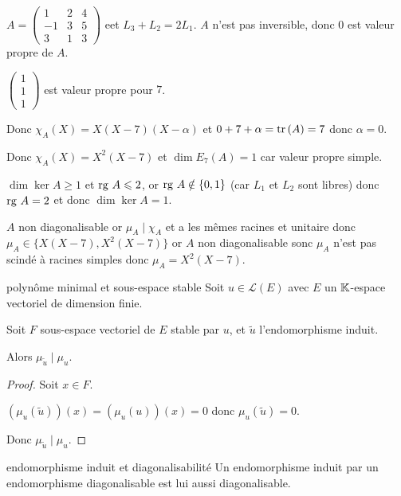 \begin{exemple}
    $A = \begin{pmatrix}
        1 & 2 & 4 \\
        -1 & 3 & 5 \\
        3 & 1 & 3 
    \end{pmatrix}$ eet $L_3 + L_2 = 2L_1$. $A$ n'est pas inversible, donc $0$ est valeur propre de $A$.

    $\begin{pmatrix}
        1 \\ 1 \\ 1
    \end{pmatrix}$ est valeur propre pour $7$. 

    Donc $\chi_A(X) = X(X - 7)(X - \alpha)$ et $0 + 7 + \alpha = \operatorname{tr} \,(A) = 7$ donc $\alpha = 0$.

    Donc $\chi_A(X) = X^2 (X - 7)$ et $\dim E_7(A) = 1$ car valeur propre simple.

    $\dim \ker A \geqslant 1$ et $\operatorname{rg} \, A \leqslant 2$, or $\operatorname{rg} \, A \notin \{0, 1\}$ (car $L_1$ et $L_2$
    sont libres) donc $\operatorname{rg} \, A = 2$ et donc $\dim \ker A = 1$.

    $A$ non diagonalisable or $\mu_A \mid \chi_A$ et a les mêmes racines et unitaire donc 
    $\mu_A \in \{X(X - 7), X^2(X - 7)\}$ or $A$ non diagonalisable sonc $\mu_A$ n'est pas scindé à racines simples donc 
    $\mu_A = X^2 (X - 7)$.
\end{exemple}

\begin{proposition}{polynôme minimal et sous-espace stable}{}
    Soit $u \in \mathscr L(E)$ avec $E$ un $\mathbb{K}$-espace vectoriel de dimension finie. 

    Soit $F$ sous-espace vectoriel de $E$ stable par $u$, et $\tilde u$ l'endomorphisme induit. 

    Alors $\mu_{\tilde u} \mid \mu_u$.
\end{proposition}


\begin{proof}
    Soit $x \in F$.

    $(\mu_u(\tilde u))(x) = (\mu_u(u))(x) = 0$ donc $\mu_u(\tilde u) = 0$.

    Donc $\mu_{\tilde u} \mid \mu_u$.
\end{proof}

\begin{corollaire}{endomorphisme induit et diagonalisabilité}{}
    Un endomorphisme induit par un endomorphisme diagonalisable est lui aussi diagonalisable.
\end{corollaire}


